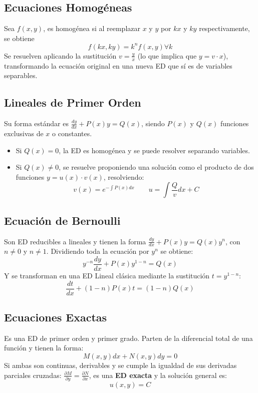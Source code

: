 \documentclass[a4paper,12pt]{article}
\begin{document}
\subsection{Ecuaciones Homogéneas}
Sea $f(x,y)$, es homogénea si al reemplazar $x$ y $y$ por $kx$ y $ky$ respectivamente, se obtiene
$$f(kx,ky) = k^n f(x,y) \forall k$$
Se resuelven aplicando la sustitución $v = \frac{y}{x}$ (lo que implica que $y = v \cdot x$), transformando la ecuación original en una nueva ED que sí es de variables separables.

\subsection{Lineales de Primer Orden}
Su forma estándar es $\frac{dy}{dx} + P(x)y = Q(x)$, siendo $P(x)$ y $Q(x)$ funciones exclusivas de $x$ o constantes.
\begin{itemize}
    \item Si $Q(x) = 0$, la ED es homogénea y se puede resolver separando variables.
    \item Si $Q(x) \neq 0$, se resuelve proponiendo una solución como el producto de dos funciones $y = u(x) \cdot v(x)$, resolviendo:
        $$ v(x) = e^{-\int P(x)dx} \qquad u = \int \frac{Q}{v} dx + C $$
\end{itemize}

\subsection{Ecuación de Bernoulli}
Son ED reducibles a lineales y tienen la forma $\frac{dy}{dx} + P(x)y = Q(x)y^n$, con $n \neq 0$ y $n \neq 1$.
Dividiendo toda la ecuación por $y^n$ se obtiene:
$$ y^{-n} \frac{dy}{dx} + P(x)y^{1-n} = Q(x) $$
Y se transforman en una ED Lineal clásica mediante la sustitución $t = y^{1-n}$:
$$ \frac{dt}{dx} + (1-n)P(x)t = (1-n)Q(x) $$

\subsection{Ecuaciones Exactas}
Es una ED de primer orden y primer grado. Parten de la diferencial total de una función y tienen la forma:
$$M(x,y)dx + N(x,y)dy = 0$$
Si ambas son continuas, derivables y se cumple la igualdad de sus derivadas parciales cruzadas: $\frac{\partial M}{\partial y} = \frac{\partial N}{\partial x}$, es una \textbf{ED exacta} y la solución general es:
$$u(x,y) = C$$
\end{document}
